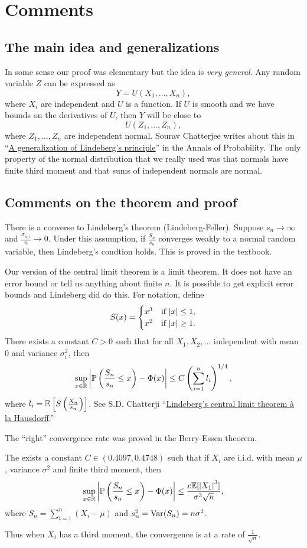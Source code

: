 \section{Comments}
\subsection{The main idea and generalizations}
In some sense our proof was elementary but the idea is \emph{very general}. Any random variable $Z$ can be expressed as 
\[Y=U(X_1,\ldots, X_n), \]
where $X_i$ are independent and $U$ is a function. If $U$ is smooth and we have bounds on the derivatives of $U$, then $Y$ will be close to 
\[U(Z_1,\ldots,Z_n),\]
where $Z_1,\ldots,Z_n$ are independent normal. Sourav Chatterjee writes about this in ``\href{https://www.jstor.org/stable/25449948
}{A generalization of Lindeberg's principle}'' in the Annals of Probability. The only property of the normal distribution that we really used was that normals have finite third moment and that sums of independent normals are normal. 
\subsection{Comments on the theorem and proof}
There is a converse to Lindeberg's theorem (Lindeberg-Feller). Suppose $s_n \to \infty$ and $\frac{\sigma_{n,i}}{n} \to 0$. Under this assumption, if $\frac{S_n}{s_n}$ converges weakly to a normal random variable, then Lindeberg's condtion holds. This is proved in the textbook.

Our version of the central limit theorem is a limit theorem. It does not have an error bound or tell us anything about finite $n$. It is possible to get explicit error bounds and Lindeberg did do this. For notation, define
\[S(x) = \begin{cases}
    x^3 &\text{if } {\left\lvert x\right\rvert} \le 1,\\
    x^2 &\text{if } {\left\lvert x\right\rvert} \ge 1.
\end{cases}\]
There exists a constant $C > 0$ such that for all $X_1,X_2,\ldots$ independent with mean 0 and variance $\sigma_i^2$, then 
\[\sup_{x \in {\mathbb R}} {\left\lvert{\mathbb{P}}\left(\frac{S_n}{s_n} \le x\right) - \Phi(x)\right\rvert} \le C\left(\sum_{i=1}^n l_i\right)^{1/4}, \]
where $l_i = {\mathbb{E}}\left[S\left(\frac{X_n}{s_n}\right)\right]$. See S.D. Chatterji ``\href{https://www.sciencedirect.com/science/article/pii/S0723086906000429}{Lindeberg's central limit theorem \`a la Hausdorff}.''

The ``right'' convergence rate was proved in the Berry-Essen theorem.
\begin{thrm}
    The exists a constant $C \in (0.4097,0.4748)$ such that if $X_i$ are i.i.d. with mean $\mu$, variance $\sigma^2$ and finite third moment, then 
    \[\sup_{x \in {\mathbb R}} {\left\lvert{\mathbb{P}}\left(\frac{S_n}{s_n} \le x\right)-\Phi(x)\right\rvert} \le \frac{c {\mathbb{E}}[{\left\lvert X_1\right\rvert}^3]}{\sigma^3\sqrt{n}}, \]
    where $S_n = \sum_{i=1}^n (X_i - \mu)$ and $s_n^2 = \operatorname{Var}(S_n) = n\sigma^2$.
\end{thrm}
Thus when $X_i$ has a third moment, the convergence is at a rate of $\frac{1}{\sqrt{n}}$.
